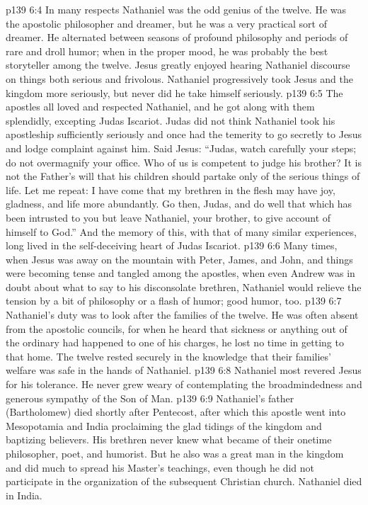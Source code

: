 \vs p139 6:4 In many respects Nathaniel was the odd genius of the twelve. He was the apostolic philosopher and dreamer, but he was a very practical sort of dreamer. He alternated between seasons of profound philosophy and periods of rare and droll humor; when in the proper mood, he was probably the best storyteller among the twelve. Jesus greatly enjoyed hearing Nathaniel discourse on things both serious and frivolous. Nathaniel progressively took Jesus and the kingdom more seriously, but never did he take himself seriously.
\vs p139 6:5 The apostles all loved and respected Nathaniel, and he got along with them splendidly, excepting Judas Iscariot. Judas did not think Nathaniel took his apostleship sufficiently seriously and once had the temerity to go secretly to Jesus and lodge complaint against him. Said Jesus: \textcolor{ubdarkred}{“Judas, watch carefully your steps; do not overmagnify your office. Who of us is competent to judge his brother? It is not the Father’s will that his children should partake only of the serious things of life. Let me repeat: I have come that my brethren in the flesh may have joy, gladness, and life more abundantly. Go then, Judas, and do well that which has been intrusted to you but leave Nathaniel, your brother, to give account of himself to God.”} And the memory of this, with that of many similar experiences, long lived in the self\hyp{}deceiving heart of Judas Iscariot.
\vs p139 6:6 Many times, when Jesus was away on the mountain with Peter, James, and John, and things were becoming tense and tangled among the apostles, when even Andrew was in doubt about what to say to his disconsolate brethren, Nathaniel would relieve the tension by a bit of philosophy or a flash of humor; good humor, too.
\vs p139 6:7 Nathaniel’s duty was to look after the families of the twelve. He was often absent from the apostolic councils, for when he heard that sickness or anything out of the ordinary had happened to one of his charges, he lost no time in getting to that home. The twelve rested securely in the knowledge that their families’ welfare was safe in the hands of Nathaniel.
\pc \vs p139 6:8 Nathaniel most revered Jesus for his tolerance. He never grew weary of contemplating the broadmindedness and generous sympathy of the Son of Man.
\pc \vs p139 6:9 Nathaniel’s father (Bartholomew) died shortly after Pentecost, after which this apostle went into Mesopotamia and India proclaiming the glad tidings of the kingdom and baptizing believers. His brethren never knew what became of their onetime philosopher, poet, and humorist. But he also was a great man in the kingdom and did much to spread his Master’s teachings, even though he did not participate in the organization of the subsequent Christian church. Nathaniel died in India.
